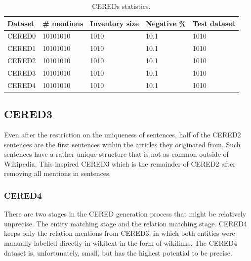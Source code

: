 \begin{table}

\caption{CEREDs statistics.}

\label{table01:S10T8}

\begin{tabular}{p{} P{2,3cm} P{2,3cm} P{2,3cm} P{2,3cm} }

\hline
Dataset & \# mentions & Inventory size & Negative \% & Test dataset\\
\hline
\hline
CERED0 & 10101010 & 1010 & 10.1 & 1010\\
CERED1 & 10101010 & 1010 & 10.1 & 1010\\
CERED2 & 10101010 & 1010 & 10.1 & 1010\\
CERED3 & 10101010 & 1010 & 10.1 & 1010\\
CERED4 & 10101010 & 1010 & 10.1 & 1010\\
\hline


\end{tabular}

\end{table}






\subsection{CERED3}
Even after the restriction on the uniqueness of sentences, half of the CERED2 sentences are the first sentences within the articles they originated from. Such sentences have a rather unique structure that is not as common outside of Wikipedia. This inspired CERED3 which is the remainder of CERED2 after removing all mentions in  sentences.

\subsubsection{CERED4}
There are two stages in the CERED generation process that might be relatively unprecise. The entity matching stage and the relation matching stage. CERED4 keeps only the relation mentions from CERED3, in which both entities were manually-labelled directly in wikitext in the form of wikilinks. The CERED4 dataset is, unfortunately, small, but has the highest potential to be precise.

